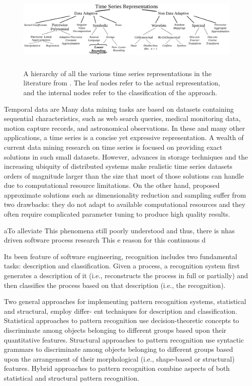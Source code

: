 \documentclass[11pt,oneside]{article}
\numberwithin{equation}{subsection}
\begin{document}
\begin{figure}[tbp]
   \centering
   \includegraphics[height=40mm]{representations.eps}
   \caption{A hierarchy of all the various time series representations in the literature from
       \cite{citeulike:2821475}. The leaf nodes refer to the actual representation, and the internal
            nodes refer to the classification of the approach.}
   \label{fig:timeseries-representations}
\end{figure}



 Temporal data are 
Many data mining tasks are based on datasets containing sequential characteristics, such
as web search queries, medical monitoring data, motion capture records, and astronomical
observations. In these and many other applications, a time series is a concise yet expressive
representation. A wealth of current data mining research on time series is focused on providing exact solutions in such small datasets. However, advances in storage techniques and
the increasing ubiquity of distributed systems make realistic time series datasets orders of
magnitude larger than the size that most of those solutions can handle due to computational
resource limitations. On the other hand, proposed approximate solutions such as dimensionality reduction and sampling suffer from two drawbacks: they do not adapt to available
computational resources and they often require complicated parameter tuning to produce high
quality results.

aTo alleviate This phenomena still poorly understood and thus, there is nhas driven software process research 
This e reason for this continuous d

Its been \cite{citeulike:11061107}
feature of software engineering, recognition includes two fundamental tasks: description and classification. Given
a process, a recognition system first generates a description of it (i.e., reconstructs the process in
full or partially) and then classifies the process based on that description (i.e., the recognition).

Two general approaches for implementing pattern recognition systems, statistical and structural, employ differ-
ent techniques for description and classification. Statistical approaches to pattern recognition use
decision-theoretic concepts to discriminate among objects belonging to different groups based upon
their quantitative features. Structural approaches to pattern recognition use syntactic grammars
to discriminate among objects belonging to different groups based upon the arrangement of their
morphological (i.e., shape-based or structural) features. Hybrid approaches to pattern recognition
combine aspects of both statistical and structural pattern recognition.
\end{document}
